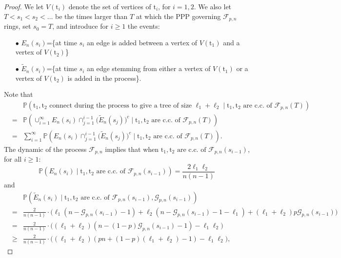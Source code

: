 \documentclass[a4, 11pt]{article}
\numberwithin{equation}{section}
\theoremstyle{plain}
\theoremstyle{definition}
\theoremstyle{remark}
\begin{document}
\begin{proof}
We let $V(\mathrm t_i)$ denote the set of vertices of $\mathrm t_i$, for $i=1,2$.
We also let $T<s_1<s_2<\ldots$ be the times larger than $T$ at which the PPP governing $\mathcal {F}_{p,n}$ rings, set $s_0=T$, and introduce for $i\geq 1$ the events:
\begin{enumerate}
\item[$\bullet$] $E_{n}(s_i)$=\{at time $s_i$ an edge is added between a vertex of $V(\mathrm t_1)$ and a vertex of $V(\mathrm t_2)$\} 
\item[$\bullet$] $\tilde E_{n}(s_i)$=\{at time $s_i$ an edge stemming from either a vertex of $V(\mathrm t_1)$ or a vertex of $V(\mathrm t_2)$ is added in the process\}.
\end{enumerate}
Note that
\begin{eqnarray*}
 &&\mathbb P\left(\mathrm t_1,\mathrm t_2 \text{ connect during the process to give a tree of size }\ell_1+\ell_2 \; | \; \mathrm t_1,\mathrm t_2 \text{ are c.c. of } \mathcal {F}_{p,n}(T)\right) \\
 &=& \mathbb P\left(\cup_{i=1}^{\infty} E_{n}(s_i) \cap_{j=1}^{i-1} \big(\tilde E_{n}(s_j)\big)^c \; | \; \mathrm t_1,\mathrm t_2 \text{ are c.c. of } \mathcal {F}_{p,n}(T)\right) \\
 &=& \sum_{i=1}^{\infty}  \mathbb P\left(E_{n}(s_i) \cap_{j=1}^{i-1} \big(\tilde E_{n}(s_j)\big)^c \; | \; \mathrm t_1,\mathrm t_2 \text{ are c.c. of } \mathcal {F}_{p,n}(T)\right).
\end{eqnarray*}
The dynamic of the process $\mathcal {F}_{p,n}$ implies that when  $\mathrm t_1,\mathrm t_2 \text{ are c.c. of } \mathcal {F}_{p,n}(s_{i-1})$, for all $i\geq 1$:
$$
 \mathbb P\left(E_{n}(s_i) \; | \; \mathrm t_1,\mathrm t_2 \text{ are c.c. of } \mathcal {F}_{p,n}(s_{i-1}) \right)= \frac{2\ell_1\ell_2}{n(n-1)}
$$ 
and
\begin{eqnarray*}
&& \mathbb P\left(\tilde E_{n}(s_i) \; | \; \mathrm t_1,\mathrm t_2 \text{ are c.c. of } \mathcal {F}_{p,n}(s_{i-1}), \mathcal G_{p,n}(s_{i-1}) \right) \\
 &=& \frac{2}{n(n-1)} \cdot \big(\ell_1\left(n-\mathcal G_{p,n}(s_{i-1})-1\right)+\ell_2\left(n-\mathcal G_{p,n}(s_{i-1})-1-\ell_1\right)+(\ell_1+\ell_2)p \mathcal G_{p,n}(s_{i-1}) \big)  \\
 &=& \frac{2}{n(n-1)} \cdot \big((\ell_1+\ell_2)(n-(1-p)\mathcal G_{p,n}(s_{i-1})-1 )-\ell_1\ell_2 \big) \\
 &\geq& \frac{2}{n(n-1)} \cdot \big( (\ell_1+\ell_2)(pn+(1-p)(\ell_1+\ell_2)-1)-\ell_1\ell_2\big),

\end{eqnarray*}
\end{proof}
\end{document}
